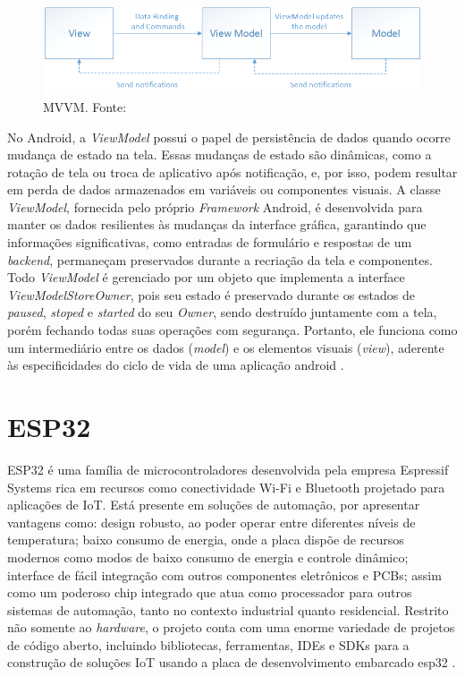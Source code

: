 \begin{figure}[ht]
    \centering
    \includegraphics[width=.57\textwidth]{img/mvvm-pattern.png}
    \caption{MVVM. Fonte:\cite{mvvm-documentation}}\label{figMVVM}
\end{figure}

No Android, a \textit{ViewModel} possui o papel de persistência de dados quando ocorre mudança 
de estado na tela. Essas mudanças de estado são dinâmicas, como a rotação de tela ou troca de aplicativo após notificação, e, por isso, 
podem resultar em perda de dados armazenados em variáveis ou componentes visuais. A classe \textit{ViewModel}, fornecida pelo próprio 
\textit{Framework} Android, é desenvolvida para manter os dados resilientes às mudanças da interface gráfica, garantindo que informações significativas, como entradas de 
formulário e respostas de um \textit{backend}, permaneçam preservados durante a recriação da tela e componentes. Todo \textit{ViewModel} é gerenciado por um objeto 
que implementa a interface \textit{ViewModelStoreOwner}, pois seu estado é preservado durante os estados de \textit{paused}, \textit{stoped} e \textit{started} do seu \textit{Owner}, sendo destruído
juntamente com a tela, porém fechando todas suas operações com segurança. Portanto, ele funciona como um intermediário entre os dados (\textit{model}) e
os elementos visuais (\textit{view}), aderente às especificidades do ciclo de vida de uma aplicação android \cite{google-developers-viewmodel}.

\section{ESP32}

ESP32 é uma família de microcontroladores desenvolvida pela empresa Espressif Systems rica em recursos como conectividade Wi-Fi e Bluetooth projetado para aplicações de IoT. 
Está presente em soluções de automação, por apresentar vantagens como: design robusto, ao poder operar entre diferentes níveis de temperatura; 
baixo consumo de energia, onde a placa dispõe de recursos modernos como modos de baixo consumo de energia e controle dinâmico; interface de fácil 
integração com outros componentes eletrônicos e PCBs; assim como um poderoso chip integrado que atua como processador para outros sistemas de automação, 
tanto no contexto industrial quanto residencial. Restrito não somente ao \textit{hardware}, o projeto conta com uma enorme variedade 
de projetos de código aberto, incluindo bibliotecas, ferramentas, IDEs e SDKs para a construção de soluções IoT usando a placa de desenvolvimento embarcado esp32 \cite{esp32-espressif-documentation}. 

